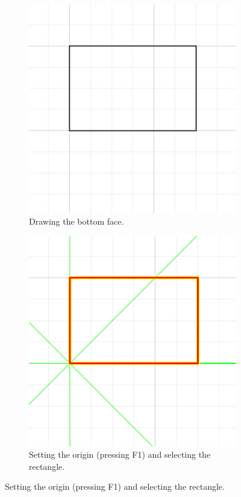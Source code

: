 \documentclass[11pt,a4paper]{article}
\begin{document}
\begin{figure}
\centering

\begin{subfigure}[t]{0.4\textwidth}
\centering
\includegraphics[scale=0.6]{png/demo_step1.png} 
\caption{Drawing the bottom face.}
\label{fig:demo1_a}
\end{subfigure}
\begin{subfigure}[t]{0.4\textwidth}
\centering
\includegraphics[scale=0.6]{png/demo_step2.png} 
\caption{Setting the origin (pressing F1) and selecting the rectangle.}
\label{fig:demo1_b}
\end{subfigure}


\end{figure}
\end{document}
